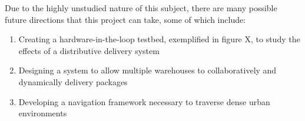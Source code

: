 Due to the highly unstudied nature of this subject, there are many possible future directions that this project can take, some of which include:

\begin{enumerate}
\item{Creating a hardware-in-the-loop testbed, exemplified in figure X, to study the effects of a distributive delivery system}

\item{Designing a system to allow multiple warehouses to collaboratively and dynamically delivery packages}

\item{Developing a navigation framework necessary to traverse dense urban environments}

\end{enumerate}
